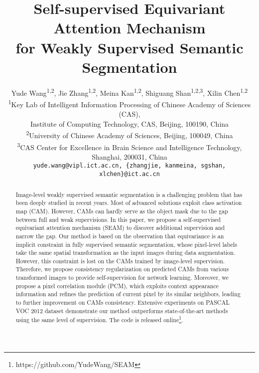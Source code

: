 \documentclass[10pt,twocolumn,letterpaper]{article}
\begin{document}
\title{Self-supervised Equivariant Attention Mechanism \\for Weakly Supervised Semantic Segmentation}
	
	\author{Yude Wang\textsuperscript{\rm 1,2}, Jie Zhang\textsuperscript{\rm 1,2}, Meina Kan\textsuperscript{\rm 1,2}, Shiguang Shan\textsuperscript{\rm 1,2,3}, Xilin Chen\textsuperscript{\rm 1,2}\\
		\textsuperscript{\rm 1}Key Lab of Intelligent Information Processing of Chinese Academy of Sciences (CAS),\\Institute of Computing Technology, CAS, Beijing, 100190, China\\
		\textsuperscript{\rm 2}University of Chinese Academy of Sciences, Beijing, 100049, China\\
		\textsuperscript{\rm 3}CAS Center for Excellence in Brain Science and Intelligence Technology, Shanghai, 200031, China\\
		{\tt\small yude.wang@vipl.ict.ac.cn, \{zhangjie, kanmeina, sgshan, xlchen\}@ict.ac.cn}}
	\maketitle


\begin{abstract}
		Image-level weakly supervised semantic segmentation is a challenging problem that has been deeply studied in recent years. Most of advanced solutions exploit class activation map (CAM). However, CAMs can hardly serve as the object mask due to the gap between full and weak supervisions. In this paper, we propose a self-supervised equivariant attention mechanism (SEAM) to discover additional supervision and narrow the gap. Our method is based on the observation that equivariance is an implicit constraint in fully supervised semantic segmentation, whose pixel-level labels take the same spatial transformation as the input images during data augmentation. However, this constraint is lost on the CAMs trained by image-level supervision. Therefore, we propose consistency regularization on predicted CAMs from various transformed images to provide self-supervision for network learning. Moreover, we propose a pixel correlation module (PCM), which exploits context appearance information and refines the prediction of current pixel by its similar neighbors, leading to further improvement on CAMs consistency. Extensive experiments on PASCAL VOC 2012 dataset demonstrate our method outperforms state-of-the-art methods using the same level of supervision. The code is released online\footnote{https://github.com/YudeWang/SEAM}.
	\end{abstract}
	
\end{document}
